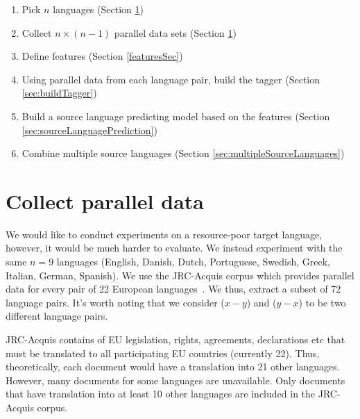 
 \begin{enumerate}
 \itemsep0em
 \item Pick $n$ languages  (Section \ref{sec:collectParaData})
 \item Collect $ n \times (n-1)$ parallel data sets (Section \ref{sec:collectParaData})
 \item Define features (Section \ref{featuresSec})
 \item Using parallel data from each language pair, build the tagger (Section \ref{sec:buildTagger})
 \item Build a source language predicting model based on the features (Section \ref{sec:sourceLanguagePrediction})
 \item Combine multiple source languages (Section \ref{sec:multipleSourceLanguages})
 \end{enumerate}


\section{Collect parallel data}
\label{sec:collectParaData}
We would like to conduct experiments on a resource-poor target language, however, it would be much harder to evaluate. We instead experiment with the same $n = 9$ languages (English, Danish, Dutch, Portuguese, Swedish, Greek, Italian, German, Spanish).  We use the JRC-Acquis corpus which provides parallel data for every pair of 22 European languages~\cite{SteinbergerAcquis}. We thus, extract a subset of 72 language pairs. It's worth noting that we consider ($x-y$) and ($y-x$) to be two different language pairs. 

JRC-Acquis contains of EU legislation, rights, agreements, declarations etc that must be translated to all participating EU countries (currently 22). Thus, theoretically, each document would have a translation into 21 other languages. However, many documents for some languages are unavailable. Only documents that have translation into at least 10 other languages are included in the JRC-Acquis corpus. 

